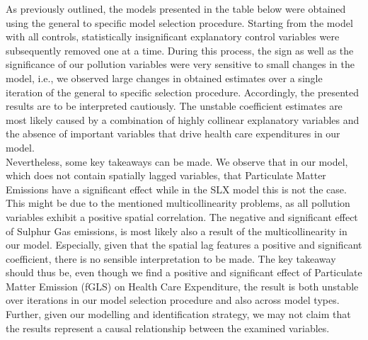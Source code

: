 \documentclass[
]{article}
\begin{document}
	As previously outlined, the models presented in the table below were obtained using the general to specific model selection procedure. Starting from the model with all controls, statistically insignificant explanatory control variables were subsequently removed one at a time. During this process, the sign as well as the significance of our pollution variables were very sensitive to small changes in the model, i.e., we observed large changes in obtained estimates over a single iteration of the general to specific selection procedure. Accordingly, the presented results are to be interpreted cautiously. The unstable coefficient estimates are most likely caused by a combination of highly collinear explanatory variables and the absence of important variables that drive health care expenditures in our model.\\ Nevertheless, some key takeaways can be made. We observe that in our model, which does not contain spatially lagged variables, that Particulate Matter Emissions have a significant effect while in the SLX model this is not the case. This might be due to the mentioned multicollinearity problems, as all pollution variables exhibit a positive spatial correlation. The negative and significant effect of Sulphur Gas emissions, is most likely also a result of the multicollinearity in our model. Especially, given that the spatial lag features a positive and significant coefficient, there is no sensible interpretation to be made. The key takeaway should thus be, even though we find a positive and significant effect of Particulate Matter Emission (fGLS) on Health Care Expenditure, the result is both unstable over iterations in our model selection procedure and also across model types. Further, given our modelling and identification strategy, we may not claim that the results represent a causal relationship between the examined variables.
\end{document}

